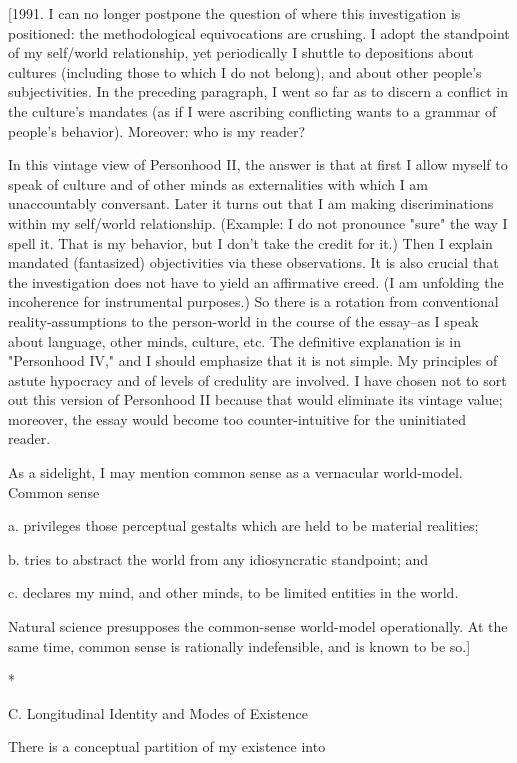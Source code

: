 [1991. I can no longer postpone the question of where this investigation is positioned: the methodological equivocations are crushing. I adopt the standpoint of my self/world relationship, yet periodically I shuttle to depositions about cultures (including those to which I do not belong), and about other people's subjectivities. In the preceding paragraph, I went so far as to discern a conflict in the culture's mandates (as if I were ascribing conflicting wants to a grammar of people's behavior). Moreover: who is my reader?

In this vintage view of Personhood II, the answer is that at first I allow myself to speak of culture and of other minds as externalities with which I am unaccountably conversant. Later it turns out that I am making discriminations within my self/world relationship. (Example: I do not pronounce "sure" the way I spell it. That is my behavior, but I don't take the credit for it.) Then I explain mandated (fantasized) objectivities via these observations. It is also crucial that the investigation does not have to yield an affirmative creed. (I am unfolding the incoherence for instrumental purposes.) So there is a rotation from conventional reality-assumptions to the person-world in the course of the essay--as I speak about language, other minds, culture, etc. The definitive explanation is in "Personhood IV," and I should emphasize that it is not simple. My principles of astute hypocracy and of levels of credulity are involved. I have chosen not to sort out this version of Personhood II because that would eliminate its vintage value; moreover, the essay would become too counter-intuitive for the uninitiated reader.

As a sidelight, I may mention common sense as a vernacular world-model. Common sense

    a. privileges those perceptual gestalts which are held to be material realities;

    b. tries to abstract the world from any idiosyncratic standpoint; and

    c. declares my mind, and other minds, to be limited entities in the world.

Natural science presupposes the common-sense world-model operationally. At the same time, common sense is rationally indefensible, and is known to be so.]

*

C. Longitudinal Identity and Modes of Existence

There is a conceptual partition of my existence into

